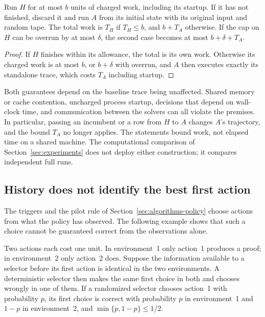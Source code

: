 \begin{proposition}\label{prop:rescue}
Run $H$ for at most $b$ units of charged work, including its startup. If it
has not finished, discard it and run $A$ from its initial state with its
original input and random tape. The total work is $T_H$ if $T_H\le b$, and
$b+T_A$ otherwise. If the cap on $H$ can be overrun by at most $\delta$, the
second case becomes at most $b+\delta+T_A$.
\end{proposition}

\begin{proof}
If $H$ finishes within its allowance, the total is its own work. Otherwise its
charged work is at most $b$, or $b+\delta$ with overrun, and $A$ then executes
exactly its standalone trace, which costs $T_A$ including startup.
\end{proof}

Both guarantees depend on the baseline trace being unaffected. Shared memory or
cache contention, uncharged process startup, decisions that depend on
wall-clock time, and communication between the solvers can all violate the
premises. In particular, passing an incumbent or a row from $H$ to $A$ changes
$A$'s trajectory, and the bound $T_A$ no longer applies. The statements bound
work, not elapsed time on a shared machine. The computational comparison of
Section~\ref{sec:experiments} does not deploy either construction; it compares
independent full runs.

\subsection{History does not identify the best first action}\label{sec:effort-history}

The triggers and the pilot rule of Section~\ref{sec:algorithms-policy} choose
actions from what the policy has observed. The following example shows that
such a choice cannot be guaranteed correct from the observations alone.

\begin{example}\label{ex:history}
Two actions each cost one unit. In environment~1 only action~1 produces a
proof; in environment~2 only action~2 does. Suppose the information available
to a selector before its first action is identical in the two environments.
A deterministic selector then makes the same first choice in both and chooses
wrongly in one of them. If a randomized selector chooses action~1 with
probability $p$, its first choice is correct with probability $p$ in
environment~1 and $1-p$ in environment~2, and $\min\{p,1-p\}\le1/2$.
\end{example}

